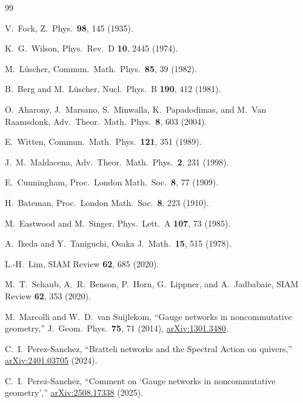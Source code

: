 \documentclass[aps,pra,twocolumn,superscriptaddress,longbibliography]{revtex4-2}
\begin{document}

\begin{thebibliography}{99}

V.~Fock, Z.\ Phys.\ \textbf{98}, 145 (1935).

K.~G.~Wilson, Phys.\ Rev.\ D \textbf{10}, 2445 (1974).

M.~L\"uscher, Commun.\ Math.\ Phys.\ \textbf{85}, 39 (1982).

B.~Berg and M.~L\"uscher, Nucl.\ Phys.\ B \textbf{190}, 412 (1981).

O.~Aharony, J.~Marsano, S.~Minwalla, K.~Papadodimas, and M.~Van
Raamsdonk, Adv.\ Theor.\ Math.\ Phys.\ \textbf{8}, 603 (2004).

E.~Witten, Commun.\ Math.\ Phys.\ \textbf{121}, 351 (1989).

J.~M.~Maldacena, Adv.\ Theor.\ Math.\ Phys.\ \textbf{2}, 231 (1998).

E.~Cunningham, Proc.\ London Math.\ Soc.\ \textbf{8}, 77 (1909).

H.~Bateman, Proc.\ London Math.\ Soc.\ \textbf{8}, 223 (1910).

M.~Eastwood and M.~Singer, Phys.\ Lett.\ A \textbf{107}, 73 (1985).

A.~Ikeda and Y.~Taniguchi, Osaka J.\ Math.\ \textbf{15}, 515 (1978).

L.-H.~Lim, SIAM Review \textbf{62}, 685 (2020).

M.~T.~Schaub, A.~R.~Benson, P.~Horn, G.~Lippner, and A.~Jadbabaie,
SIAM Review \textbf{62}, 353 (2020).

M.~Marcolli and W.~D.~van Suijlekom,
``Gauge networks in noncommutative geometry,''
J.\ Geom.\ Phys.\ \textbf{75}, 71 (2014),
\href{https://arxiv.org/abs/1301.3480}{arXiv:1301.3480}.

C.~I.~Perez-Sanchez,
``Bratteli networks and the Spectral Action on quivers,''
\href{https://arxiv.org/abs/2401.03705}{arXiv:2401.03705} (2024).

C.~I.~Perez-Sanchez,
``Comment on `Gauge networks in noncommutative geometry',''
\href{https://arxiv.org/abs/2508.17338}{arXiv:2508.17338} (2025).


\end{thebibliography}
\end{document}
